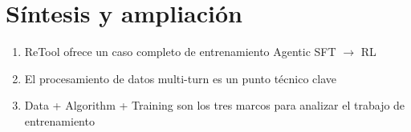 \section{Síntesis y ampliación}
\begin{enumerate}
  \item ReTool ofrece un caso completo de entrenamiento Agentic SFT $\to$ RL
  \item El procesamiento de datos multi-turn es un punto técnico clave
  \item Data + Algorithm + Training son los tres marcos para analizar el trabajo de entrenamiento
\end{enumerate}


